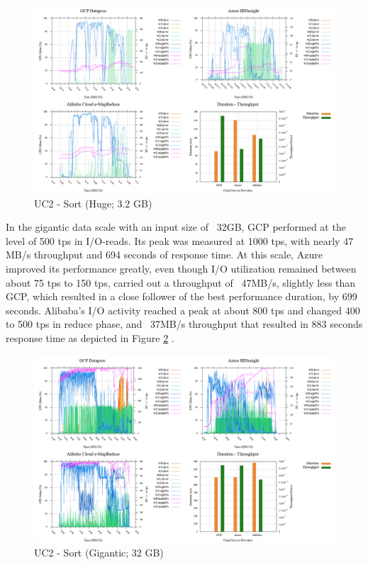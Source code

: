 \documentclass[review]{elsarticle}
\begin{document}
\begin{figure}[p]
	\caption{UC2 - Sort (Huge; 3.2 GB)}
	\label{fig:uc2-srt-h-cmidt}
	\includegraphics[width=\textwidth]{uc2-srt-h-cmidt}
	\centering
\end{figure}

In the gigantic data scale with an input size of ~32GB, GCP performed at the level of 500 tps in I/O-reads. Its peak was measured at 1000 tps, with nearly 47 MB/s throughput and 694 seconds of response time. At this scale, Azure improved its performance greatly, even though I/O utilization remained between about 75 tps to 150 tps, carried out a throughput of ~47MB/s, slightly less than GCP, which resulted in a close follower of the best performance duration, by 699 seconds. Alibaba's I/O activity reached a peak at about 800 tps and changed 400 to 500 tps in reduce phase, and ~37MB/s throughput that resulted in 883 seconds response time as depicted in Figure \ref{fig:uc2-srt-g-cmidt} .

\begin{figure}[p]
	\caption{UC2 - Sort (Gigantic; 32 GB)}
	\label{fig:uc2-srt-g-cmidt}
	\includegraphics[width=\textwidth]{uc2-srt-g-cmidt}
	\centering
\end{figure}
\end{document}
